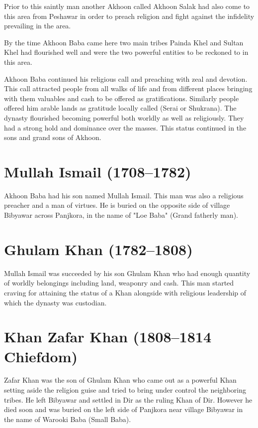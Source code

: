 \documentclass[twoside,openright]{book}
\begin{document}
Prior to this saintly man another Akhoon called Akhoon Salak had also come to
this area from Peshawar in order to preach religion and fight against the
infidelity prevailing in the area.

By the time Akhoon Baba came here two main tribes Painda Khel and Sultan Khel
had flourished well and were the two powerful entities to be reckoned to in this
area.

Akhoon Baba continued his religious call and preaching with zeal and devotion.
This call attracted people from all walks of life and from different places
bringing with them valuables and cash to be offered as gratifications. Similarly
people offered him arable lands as gratitude locally called (Serai or Shukrana).
The dynasty flourished becoming powerful both worldly as well as religiously.
They had a strong hold and dominance over the masses. This status continued in
the sons and grand sons of Akhoon.

\section{Mullah Ismail (1708--1782)}

Akhoon Baba had his son named Mullah Ismail. This man was also a religious
preacher and a man of virtues. He is buried on the opposite side of village
Bibyawar across Panjkora, in the name of "Loe Baba" (Grand fatherly man).

\section{Ghulam Khan (1782--1808)}

Mullah Ismail was succeeded by his son Ghulam Khan who had enough quantity of
worldly belongings including land, weaponry and cash. This man started craving
for attaining the status of a Khan alongside with religious leadership of which
the dynasty was custodian.

\section{Khan Zafar Khan (1808--1814 Chiefdom)}

Zafar Khan was the son of Ghulam Khan who came out as a powerful Khan setting
aside the religion guise and tried to bring under control the neighboring
tribes. He left Bibyawar and settled in Dir as the ruling Khan of Dir. However
he died soon and was buried on the left side of Panjkora near village Bibyawar
in the name of Warooki Baba (Small Baba).
\end{document}
